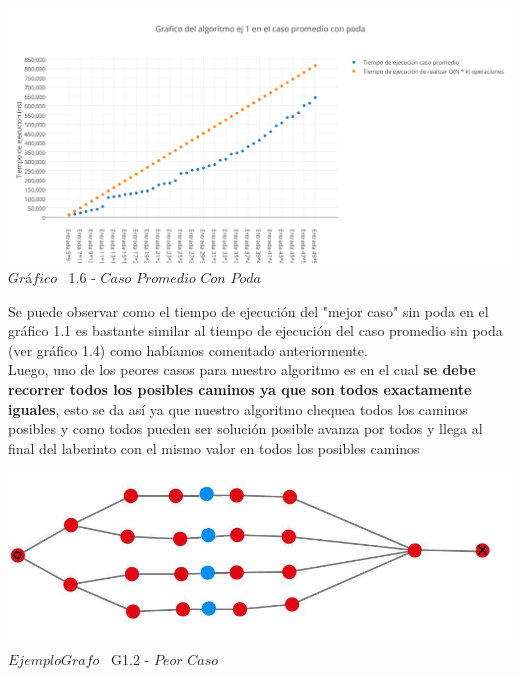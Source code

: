 \vspace*{0.3cm} \vspace*{0.3cm}
  \begin{center}
 \includegraphics[scale=0.65]{./EJ1/promedio11.png}
 {$Gr$\'a$fico$ \ 1.6 - $Caso$ $Promedio$ $Con$ $Poda$}
  \end{center}
  \vspace*{0.3cm}  
  
  
Se puede observar como el tiempo de ejecuci\'on del "mejor caso" sin poda en el gr\'afico 1.1 es bastante similar al tiempo de ejecuci\'on del caso promedio sin poda (ver gr\'afico 1.4) como hab\'iamos comentado anteriormente.\\

Luego, uno de los peores casos para nuestro algoritmo es en el cual  \textbf{se debe recorrer todos los posibles caminos ya que son todos exactamente iguales}, esto se da as\'i ya que nuestro algoritmo chequea todos los caminos posibles y como todos pueden ser soluci\'on posible avanza por todos y llega al final del laberinto con el mismo valor en todos los posibles caminos\\

\vspace*{0.3cm} \vspace*{0.3cm}
  \begin{center}
\includegraphics[scale=0.65]{./EJ1/ej1grafopeorcaso.jpeg}
{$Ejemplo Grafo$ \ G1.2 - $Peor$ $Caso$}
  \end{center}
  \vspace*{0.3cm}

